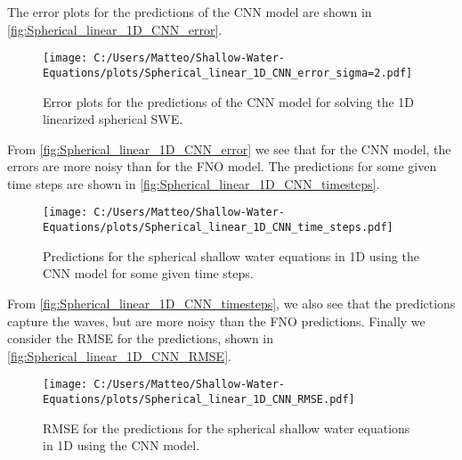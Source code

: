 The error plots for the predictions of the CNN model are shown in \autoref{fig:Spherical_linear_1D_CNN_error}.
\begin{figure}[H]
    \centering
    \texttt{[image: C:/Users/Matteo/Shallow-Water-Equations/plots/Spherical\_linear\_1D\_CNN\_error\_sigma=2.pdf]}
    \caption{Error plots for the predictions of the CNN model for solving the 1D linearized spherical SWE.}\label{fig:Spherical_linear_1D_CNN_error}
\end{figure}
From \autoref{fig:Spherical_linear_1D_CNN_error} we see that for the CNN model, the errors are more noisy than for the FNO model.
The predictions for some given time steps are shown in \autoref{fig:Spherical_linear_1D_CNN_timesteps}.
\begin{figure}[H]
    \centering
    \texttt{[image: C:/Users/Matteo/Shallow-Water-Equations/plots/Spherical\_linear\_1D\_CNN\_time\_steps.pdf]}
    \caption{Predictions for the spherical shallow water equations in 1D using the CNN model for some given time steps.}\label{fig:Spherical_linear_1D_CNN_timesteps}
\end{figure}
From \autoref{fig:Spherical_linear_1D_CNN_timesteps}, we also see that the predictions capture the waves, but are more noisy than the FNO predictions.
Finally we consider the RMSE for the predictions, shown in \autoref{fig:Spherical_linear_1D_CNN_RMSE}.
\begin{figure}[H]
    \centering
    \texttt{[image: C:/Users/Matteo/Shallow-Water-Equations/plots/Spherical\_linear\_1D\_CNN\_RMSE.pdf]}
    \caption{RMSE for the predictions for the spherical shallow water equations in 1D using the CNN model.}\label{fig:Spherical_linear_1D_CNN_RMSE}
\end{figure}


